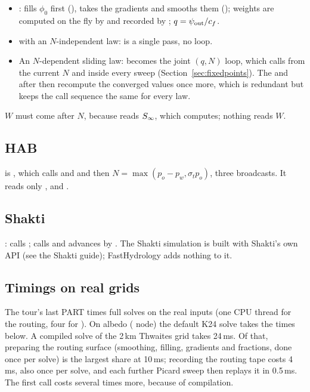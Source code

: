\begin{itemize}[leftmargin=1.5em]
\item {}:  fills $\phi_0$ first (), takes the gradients
  and smooths them (); weights are computed on the fly by
   and recorded by ; $q = {\psi_{\rm out}}/c_f$.
\item {} with an $N$-independent law:  is a single pass, no loop.
\item An $N$-dependent sliding law:  becomes the joint $(q, N)$ loop, which calls  from the
  current $N$ and  inside every sweep (Section~\ref{sec:fixedpoints}). The  and 
  after  then recompute the converged values once more, which is redundant but keeps the call sequence
  the same for every law.
\end{itemize}
$W$ must come after $N$, because  reads ${S_\infty}$, which  computes; nothing reads $W$.

\subsection{HAB}
 is , which calls  and  and then
$N = \max(p_o - p_w, \sigma_t p_o)$, three broadcasts. It reads only ,  and .

\subsection{Shakti}
:  calls ;
 calls  and advances  by . The Shakti simulation is
built with Shakti's own API (see the Shakti guide); FastHydrology adds nothing to it.

\subsection{Timings on real grids}\label{life:timing}
The tour's last PART times full solves on the real inputs (one CPU thread for the routing, four for ).
On albedo ( node) the default K24 solve takes the times below. A compiled solve of the 2\,km Thwaites grid takes
24\,ms. Of that, preparing the routing surface (smoothing, filling, gradients and fractions, done once per solve) is the
largest share at 10\,ms; recording the routing tape costs 4\,ms, also once per solve, and each further Picard sweep then
replays it in 0.5\,ms. The first call costs several times more, because of compilation.

